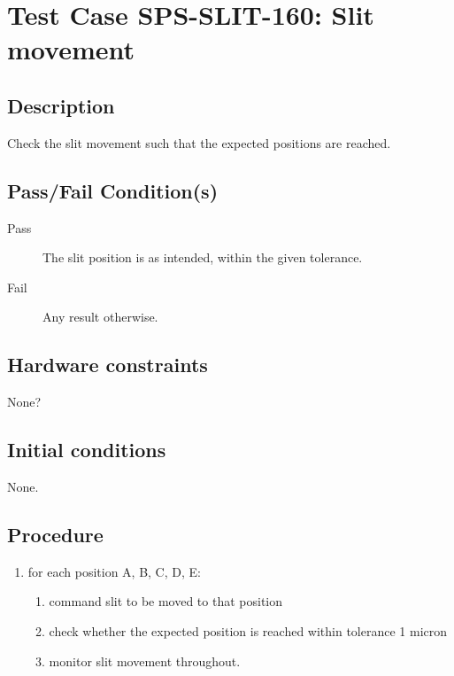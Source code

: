 \section{Test Case SPS-SLIT-160: Slit movement}

\subsection{Description}

Check the slit movement such that the expected positions are reached.

\subsection{Pass/Fail Condition(s)}

\begin{description}
\item [Pass] The slit position is as intended, within the given tolerance.
\item [Fail] Any result otherwise. 
\end{description}

\subsection{Hardware constraints}

None?

\subsection{Initial conditions}

None.

\subsection{Procedure}

\begin{enumerate}
    \item for each position A, B, C, D, E:
    \begin{enumerate}
        \item command slit to be moved to that position
        \item check whether the expected position is reached within tolerance 1 micron
        \item monitor slit movement throughout.
    \end{enumerate}
\end{enumerate}

